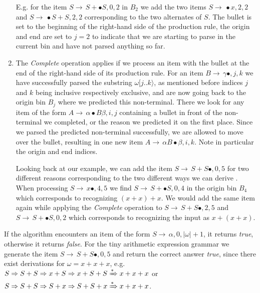 \begin{isabellebody}
\begin{isamarkuptext}
\begin{enumerate}
    E.g. for the item  $S \rightarrow \, S + \bullet S, 0, 2$ in $B_2$
    we add the two items $S \rightarrow \, \bullet x, 2, 2$ and $S \rightarrow \, \bullet S + S, 2, 2$ corresponding
    to the two alternates of $S$. The bullet is set to the beginning of the right-hand side of the production
    rule, the origin and end are set to $j = 2$ to indicate that we are starting to parse in the current bin and
    have not parsed anything so far.
  \item The \textit{Complete} operation applies if we process an item with the bullet at the end of the
    right-hand side of its production rule. For an item $B \rightarrow \, \gamma \bullet, j, k$ we have successfully parsed the substring
    $\omega [ j..k \rangle$, as mentioned before indices $j$ and $k$ being inclusive respectively exclusive, and are now going back to the origin bin $B_j$ where we predicted this non-terminal. There we look for any item of the form
    $A \rightarrow \, \alpha \bullet B \beta, i, j$ containing a bullet in front of the non-terminal we completed, or the reason we
    predicted it on the first place. Since we parsed the predicted non-terminal successfully, we are allowed to
    move over the bullet, resulting in one new item $A \rightarrow \, \alpha B \bullet \beta, i, k$. Note in particular
    the origin and end indices.

    Looking back at our example, we can add the item $S \rightarrow \, S + S \bullet, 0, 5$
    for two different reasons corresponding to the two different ways we can derive \omega.
    When processing $S \rightarrow \, x \bullet, 4, 5$ we find $S \rightarrow \, S + \bullet S, 0, 4$ in the origin
    bin $B_4$ which corresponds to recognizing $(x + x) + x$. We would add the same item again
    while applying the \textit{Complete} operation to $S \rightarrow \, S + S \bullet, 2, 5$ and $S \rightarrow \, S + \bullet S, 0, 2$
    which corresponds to recognizing the input as $x + (x + x)$.
\end{enumerate}

If the algorithm encounters an item of the form $S \rightarrow \, \alpha, 0, \lvert \omega \rvert + 1$,
it returns \textit{true}, otherwise it returns \textit{false}. For the tiny arithmetic expression grammar
we generate the item $S \rightarrow \, S + S \bullet, 0, 5$ and return the correct answer \textit{true},
since there exist derivations for $\omega = x + x + x$, e.g.
$S \Rightarrow S + S \Rightarrow x + S \Rightarrow x + S + S \xRightarrow{\ast} x + x + x$ or
$S \Rightarrow S + S \Rightarrow S + x \Rightarrow S + S + x \xRightarrow{\ast} x + x + x$.


\end{isamarkuptext}
\end{isabellebody}
